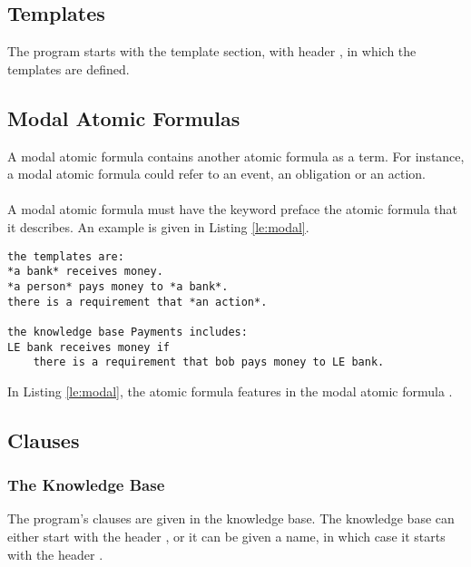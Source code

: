 \documentclass[../main.tex]{subfiles}
\begin{document}
\subsection{Templates}
The program starts with the template section, with header , in which the templates are defined. 

\subsection{Modal Atomic Formulas}
A modal atomic formula contains another atomic formula as a term. For instance, a modal atomic formula could refer to an event, an obligation or an action. 
\\
\\
A modal atomic formula must have the keyword  preface the atomic formula that it describes. An example is given in Listing \ref{le:modal}.
\begin{lstlisting}[language=LE,label={le:modal},caption={An example of an atomic formula featuring in a modal atomic formula.}]
the templates are:
*a bank* receives money.
*a person* pays money to *a bank*.
there is a requirement that *an action*.

the knowledge base Payments includes:
LE bank receives money if
    there is a requirement that bob pays money to LE bank.
\end{lstlisting}
In Listing \ref{le:modal}, the atomic formula  features in the modal atomic formula .

\subsection{Clauses}
\label{section:knowledge-base}
\subsubsection{The Knowledge Base}
The program's clauses are given in the knowledge base. The knowledge base can either start with the header , or it can be given a name, in which case it starts with the header . 
\end{document}

